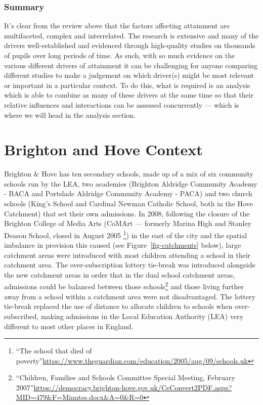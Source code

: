 \documentclass[
  11pt,
]{article}
\begin{document}
\subsubsection{Summary}\label{summary}

It's clear from the review above that the factors affecting attainment
are multifaceted, complex and interrelated. The research is extensive
and many of the drivers well-established and evidenced through
high-quality studies on thousands of pupils over long periods of time.
As such, with so much evidence on the various different drivers of
attainment it can be challenging for anyone comparing different studies
to make a judgement on which driver(s) might be most relevant or
important in a particular context. To do this, what is required is an
analysis which is able to combine as many of these drivers at the same
time so that their relative influences and interactions can be assessed
concurrently --- which is where we will head in the analysis section.

\section{Brighton and Hove Context}\label{brighton-and-hove-context}

Brighton \& Hove has ten secondary schools, made up of a mix of six
community schools run by the LEA, two academies (Brighton Aldridge
Community Academy - BACA and Portslade Aldridge Community Academy -
PACA) and two church schools (King's School and Cardinal Newman Catholic
School, both in the Hove Catchment) that set their own admissions. In
2008, following the closure of the Brighton College of Media Arts
(CoMArt --- formerly Marina High and Stanley Deason School, closed in
August 2005 \footnote{``The school that died of
  poverty''\url{https://www.theguardian.com/education/2005/aug/09/schools.uk}})
in the east of the city and the spatial imbalance in provision this
caused (see Figure~\ref{fig-catchments} below), large catchment areas
were introduced with most children attending a school in their catchment
area. The over-subscription lottery tie-break was introduced alongside
the new catchment areas in order that in the dual school catchment
areas, admissions could be balanced between those schools\footnote{``Children,
  Families and Schools Committee Special Meeting, February
  2007''\url{https://democracy.brighton-hove.gov.uk/CeConvert2PDF.aspx?MID=479&F=Minutes.docx&A=0&R=0}}
and those living further away from a school within a catchment area were
not disadvantaged. The lottery tie-break replaced the use of distance to
allocate children to schools when over-subscribed, making admissions in
the Local Education Authority (LEA) very different to most other places
in England.
\end{document}
